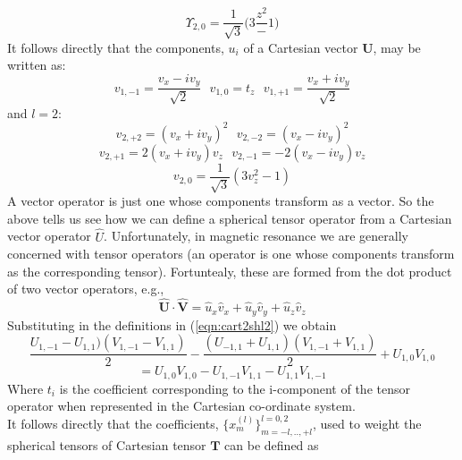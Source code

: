 \documentclass[12pt]{article}
\begin{document}
\begin{equation}
 \Upsilon_{2,0} =\frac{1}{\sqrt{3}} \Bigg( 3\frac{z^{2}} -1 \Bigg )
\end{equation}
\noindent It follows directly that the components, $u_{i}$ of a Cartesian
vector $\mathbf{U}$, may be written as:
\begin{equation}
v_{1,-1} = \frac{v_{x}-iv_{y}}{\sqrt{2}} \text{\ \ \ }
v_{1,0}  = t_{z} \text{\ \ \ }
v_{1,+1} = \frac{v_{x}+iv_{y}}{\sqrt{2}}
\label{eqn:cart2shl2}
\end{equation}
and $l=2$:
\begin{equation*}
v_{2,+2} = (v_{x}+iv_{y})^{2}\text{\ \ \ }
v_{2,-2} = (v_{x}-iv_{y})^{2}
\end{equation*}
\begin{equation*}
v_{2,+1} = 2(v_{x}+iv_{y})v_{z} \text { \ \ \ }
v_{2,-1} = -2(v_{x}-iv_{y})v_{z} 
\end{equation*}
\begin{equation}
v_{2,0} =\frac{1}{\sqrt{3}} ( 3v_{z}^{2} -1  )
\label{eqn:cart2shl2}
\end{equation}
\noindent A vector operator is just one whose components transform
as a vector. So the above tells us see how we can define a spherical
tensor operator from a Cartesian vector operator $\hat{U}$. Unfortunately, 
in magnetic resonance we are generally concerned with tensor operators
(an operator is one whose components transform as the corresponding tensor). 
Fortuntealy, these are formed from the dot product of two vector operators, e.g.,
\begin{equation}
\mathbf{\hat{U}}\cdot\mathbf{\hat{V}} =
 \hat{u}_{x}\hat{v}_{x}+
 \hat{u}_{y}\hat{v}_{y}+
 \hat{u}_{z}\hat{v}_{z}
\end{equation}
Substituting in the definitions in (\ref{eqn:cart2shl2}) we obtain
\begin{equation*}
  \frac{U_{1,-1}-U_{1,1})(V_{1,-1}-V_{1,1})}{2}
- \frac{(U_{-1,1}+U_{1,1})(V_{1,-1}+V_{1,1})}{2}
+U_{1,0}V_{1,0}
\end{equation*}
\begin{equation}
=U_{1,0}V_{1,0}-U_{1,-1}V_{1,1}-U_{1,1}V_{1,-1}
\end{equation}
 Where $t_{i}$ is the coefficient corresponding to the 
i-component of the tensor operator when represented in the 
Cartesian co-ordinate system.\\

\noindent It follows directly that the coefficients,
$\{x^{(l)}_{m}\}^{l = 0, 2}_{m = -l,..,+l}$, used to weight the spherical tensors 
of Cartesian tensor $\mathbf{T}$ can be defined as
\end{document}

